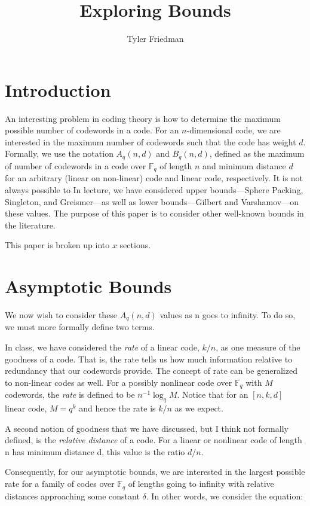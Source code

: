 \documentclass{article}
\title{Exploring Bounds}
\author{Tyler Friedman}
\numberwithin{theorem}{subsection}
\begin{document}
\maketitle

\section{Introduction}

An interesting problem in coding theory is how to determine the maximum possible
number of codewords in a code.  For an $n$-dimensional code, we are interested in 
the maximum number of codewords such that the code has weight $d$.  
Formally, we use the notation $A_q(n,d)$
and $B_q(n,d)$, defined as the maximum of number of codewords in a code over
$\mathbb{F}_q$ of length $n$ and minimum distance $d$ for an arbitrary (linear
on non-linear) code and linear code, respectively.  It is not always possible to In lecture, we have
considered upper bounds---Sphere Packing, Singleton, and Greismer---as well as
lower bounds---Gilbert and Varshamov---on these values.  The purpose of this
paper is to consider other well-known bounds in the literature.

This paper is broken up into $x$ sections.


\section{Asymptotic Bounds}
We now wish to consider these $A_q(n,d)$ values as n goes to infinity.  To do so, we must more formally define two terms.

In class, we have considered the \textit{rate} of a linear code, $k/n$, as one measure of the goodness of a code.  That is,
the rate tells us how much information relative to redundancy that our codewords provide.  The concept of rate can be generalized
to non-linear codes as well.  For a possibly nonlinear code over $\mathbb{F}_q$ with $M$ codewords, the \textit{rate} is defined to be $n^{-1} \log_q {M}$.  Notice that
for an $[n,k,d]$ linear code, $M = q^k$ and hence the rate is $k/n$ as we expect.

A second notion of goodness that we have discussed, but I think not formally defined, is the \textit{relative distance} of a code.  For a linear or nonlinear code of length n
has minimum distance d, this value is the ratio $d/n$. 

Consequently, for our asymptotic bounds, we are interested in the largest possible rate for a family of codes over $\mathbb{F}_q$ of lengths going to infinity with relative 
distances approaching some constant $\delta$.  In other words, we consider the equation:
\end{document}
